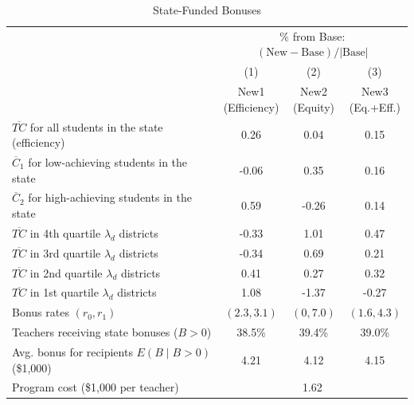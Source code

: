 \documentclass[notitlepage,12pt]{article}%
\begin{document}
\begin{table}
\caption{State-Funded Bonuses}
\centering
{\setlength{\tabcolsep}{16pt}

\begin{tabular}{@{}
    l
    @{\extracolsep{\fill}}
    c c c
@{}}
\hline\hline

& \multicolumn{3}{c}{\% from Base: $(\text{New}-\text{Base})/|\text{Base}|$} \\ 
\cline{2-4}

& (1) & (2) & (3) \\

& \shortstack{New1\\(Efficiency)}
& \shortstack{New2\\(Equity)}
& \shortstack{New3\\(Eq.+Eff.)} \\

\hline

$\overline{TC}$ for all students in the state (efficiency)
& 0.26 & 0.04 & 0.15\\

$\overline{C}_{1}$ for low-achieving students in the state
& -0.06 & 0.35 & 0.16\\

$\overline{C}_{2}$ for high-achieving students in the state
& 0.59 & -0.26 & 0.14\\

$\overline{TC}$ in 4th quartile $\lambda_{d}$ districts
& -0.33 & 1.01 & 0.47\\

$\overline{TC}$ in 3rd quartile $\lambda_{d}$ districts
& -0.34 & 0.69 & 0.21\\

$\overline{TC}$ in 2nd quartile $\lambda_{d}$ districts
& 0.41 & 0.27 & 0.32\\

$\overline{TC}$ in 1st quartile $\lambda_{d}$ districts
& 1.08 & -1.37 & -0.27\\

\hline

Bonus rates $(r_{0},r_{1})$
& $(2.3, 3.1)$ & $(0, 7.0)$ & $(1.6, 4.3)$\\

Teachers receiving state bonuses ($B>0$)
& 38.5\% & 39.4\% & 39.0\%\\

Avg. bonus for recipients $E(B\mid B>0)$ (\$1,000)
& 4.21 & 4.12 & 4.15\\

Program cost (\$1,000 per teacher)
& \multicolumn{3}{c}{1.62} \\


\end{tabular}}
\end{table}
\end{document}
